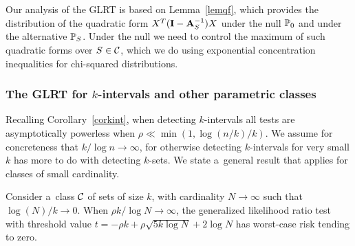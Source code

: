\documentclass[10pt, oneside]{article}
\begin{document}
Our analysis of the GLRT is based on Lemma~\ref{lemqf}, which
provides the
distribution of the quadratic form $X^T (\mathbf{I}- \mathbf{A}_S^{-1}) X$ under
the null $\mathbb{P}_0$ and under the alternative $\mathbb{P}_S$.
Under the null we need to control the maximum of such quadratic forms
over $S \in{\mathcal C}$, which we do using exponential concentration
inequalities for chi-squared distributions.

\subsubsection{The GLRT for $k$-intervals and other parametric classes}

Recalling Corollary~\ref{corkint}, when detecting $k$-intervals all
tests are
asymptotically powerless when $\rho\ll\min(1, \log(n/k)/k)$. We
assume for concreteness that
$k/\log n \to\infty$, for otherwise detecting $k$-intervals for very
small $k$ has more to do with detecting $k$-sets. We state a~general
result that applies for classes
of small cardinality.
%
\begin{prop} \label{prpglrt-small} Consider a~class ${\mathcal C}$ of sets of
size $k$, with cardinality $N
\to\infty$ such that $\log(N)/k \to0$. When $\rho k / \log N
\to\infty$, the generalized likelihood ratio test with threshold
value $t = - \rho k + \rho\sqrt{5 k \log N} + 2\log N$ has
worst-case
risk tending to zero.
\end{prop}
%
\end{document}
